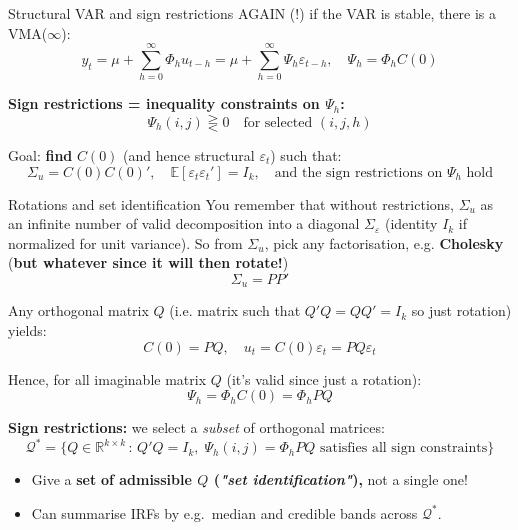 \documentclass{beamer}
\begin{document}
\begin{frame}{Structural VAR and sign restrictions}
\small
AGAIN (!) if the VAR is stable, there is a VMA($\infty$):
\[
y_t = \mu + \sum_{h=0}^{\infty} \Phi_h u_{t-h}
    = \mu + \sum_{h=0}^{\infty} \Psi_h \varepsilon_{t-h},
\quad
\Psi_h = \Phi_h C(0)
\]

\medskip
\textbf{Sign restrictions = inequality constraints on $\Psi_h$:}
\[
\Psi_h(i,j) \gtreqless 0
\quad\text{for selected } (i,j,h)
\]

Goal: \textbf{find} $C(0)$ (and hence structural $\varepsilon_t$) such that:
\[
\Sigma_u = C(0)C(0)',
\quad
\mathbb{E}[\varepsilon_t \varepsilon_t']=I_k,
\quad
\text{and the sign restrictions on } \Psi_h \text{ hold}
\]
\end{frame}

\begin{frame}{Rotations and set identification}
\small
You remember that without restrictions, $\Sigma_u$ as an infinite number of valid decomposition into a diagonal 
$\Sigma_\varepsilon$ (identity $I_k$ if normalized for unit variance). So from $\Sigma_u$, pick any factorisation, e.g. \textbf{Cholesky} (\textbf{but whatever since it will then rotate!})
\[
\Sigma_u = P P'
\]

Any orthogonal matrix $Q$ (i.e. matrix such that $Q'Q = QQ' = I_k$ so just rotation) yields:
\[
C(0) = P Q,
\quad
u_t = C(0)\varepsilon_t = P Q \varepsilon_t
\]

\medskip
Hence, for all imaginable matrix $Q$ (it's valid since just a rotation):
\[
\Psi_h = \Phi_h C(0) = \Phi_h P Q
\]

\textbf{Sign restrictions:} we select a \emph{subset} of orthogonal matrices:
\[
\mathcal{Q}^* = \big\{Q \in \mathbb{R}^{k\times k} \,:\,
Q'Q=I_k,\; \Psi_h(i,j)=\Phi_h P Q \text{ satisfies all sign constraints} \big\}
\]

\medskip
\begin{itemize}
  \item  Give a \textbf{set}\textbf{ of admissible $Q$ (\textit{"set identification"}), }not a single one!
  \item  Can summarise IRFs by e.g.\ median and credible bands across $\mathcal{Q}^*$.
\end{itemize}
\end{frame}
\end{document}
